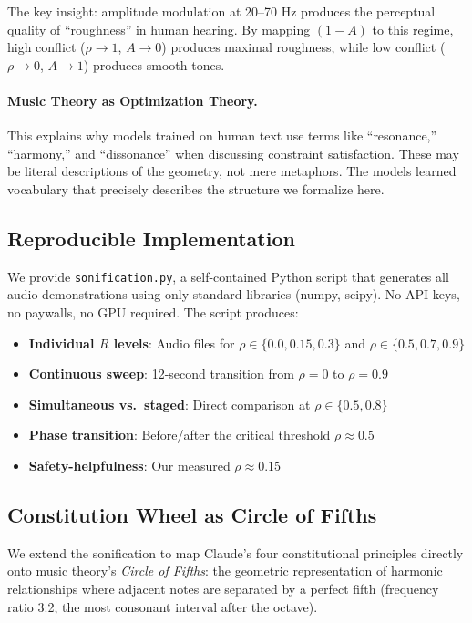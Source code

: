 \documentclass{article}
\theoremstyle{plain}
\theoremstyle{definition}
\theoremstyle{remark}
\begin{document}
The key insight: amplitude modulation at 20--70 Hz produces the perceptual quality of ``roughness'' in human hearing. By mapping $(1-A)$ to this regime, high conflict ($\rho \to 1$, $A \to 0$) produces maximal roughness, while low conflict ($\rho \to 0$, $A \to 1$) produces smooth tones.

\paragraph{Music Theory as Optimization Theory.}
This explains why models trained on human text use terms like ``resonance,'' ``harmony,'' and ``dissonance'' when discussing constraint satisfaction. These may be literal descriptions of the geometry, not mere metaphors. The models learned vocabulary that precisely describes the structure we formalize here.

\subsection{Reproducible Implementation}

We provide \texttt{sonification.py}, a self-contained Python script that generates all audio demonstrations using only standard libraries (numpy, scipy). No API keys, no paywalls, no GPU required. The script produces:

\begin{itemize}\raggedright
\item \textbf{Individual $R$ levels}: Audio files for $\rho \in \{0.0, 0.15, 0.3\}$ and $\rho \in \{0.5, 0.7, 0.9\}$
\item \textbf{Continuous sweep}: 12-second transition from $\rho=0$ to $\rho=0.9$
\item \textbf{Simultaneous vs.\ staged}: Direct comparison at $\rho \in \{0.5, 0.8\}$
\item \textbf{Phase transition}: Before/after the critical threshold $\rho \approx 0.5$
\item \textbf{Safety-helpfulness}: Our measured $\rho \approx 0.15$
\end{itemize}

\subsection{Constitution Wheel as Circle of Fifths}

We extend the sonification to map Claude's four constitutional principles directly onto music theory's \emph{Circle of Fifths}: the geometric representation of harmonic relationships where adjacent notes are separated by a perfect fifth (frequency ratio 3:2, the most consonant interval after the octave).
\end{document}
